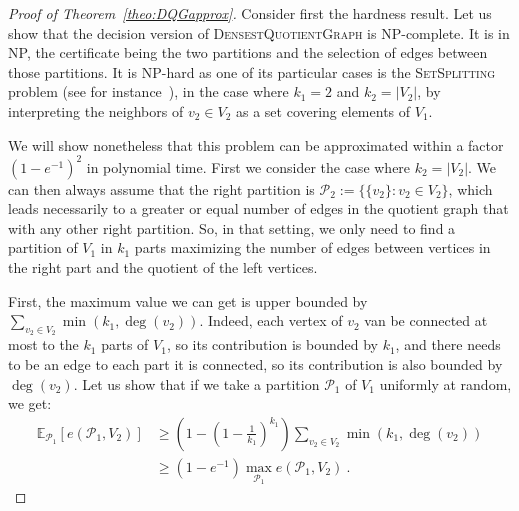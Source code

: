 \begin{proof}[Proof of Theorem~\ref{theo:DQGapprox}]
  Consider first the hardness result. Let us show that the decision version of \textsc{DensestQuotientGraph} is \textrm{NP}-complete. It is in \textrm{NP}, the certificate being the two partitions and the selection of edges between those partitions. It is \textrm{NP}-hard as one of its particular cases is the \textsc{SetSplitting} problem (see for instance~\cite{GJ79}), in the case where $k_1=2$ and $k_2=|V_2|$, by interpreting the neighbors of $v_2 \in V_2$ as a set covering elements of $V_1$.

We will show nonetheless that this problem can be approximated within a factor $(1-e^{-1})^2$ in polynomial time. First we consider the case where $k_2=|V_2|$. We can then always assume that the right partition is $\mathcal{P}_2 := \{ \{v_2\} : v_2 \in V_2 \}$, which leads necessarily to a greater or equal number of edges in the quotient graph that with any other right partition. So, in that setting, we only need to find a partition of $V_1$ in $k_1$ parts maximizing the number of edges between vertices in the right part and the quotient of the left vertices.

First, the maximum value we can get is upper bounded by $\sum_{v_2 \in V_2}\min\left(k_1,\deg(v_2)\right)$. Indeed, each vertex of $v_2$ van be connected at most to the $k_1$ parts of $V_1$, so its contribution is bounded by $k_1$, and there needs to be an edge to each part it is connected, so its contribution is also bounded by $\deg(v_2)$. Let us show that if we take a partition $\mathcal{P}_1$ of $V_1$ uniformly at random, we get:
\begin{equation}
  \begin{aligned}
  \mathbb{E}_{\mathcal{P}_1}[e(\mathcal{P}_1,V_2)] &\geq \left(1-\left(1-\frac{1}{k_1}\right)^{k_1}\right)\sum_{v_2 \in V_2}\min\left(k_1,\deg(v_2)\right)\\
  &\geq (1-e^{-1})\max_{\mathcal{P}_1}e(\mathcal{P}_1,V_2) \ .
  \end{aligned}
\end{equation}  


\end{proof}
